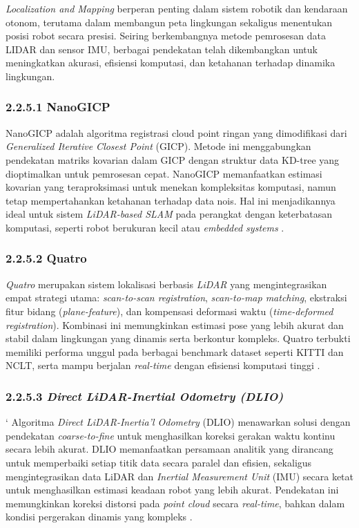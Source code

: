  \textit{ Localization and Mapping} berperan penting dalam sistem robotik dan kendaraan otonom, terutama dalam membangun peta lingkungan sekaligus menentukan posisi robot secara presisi. Seiring berkembangnya metode pemrosesan data LIDAR dan sensor IMU, berbagai pendekatan telah dikembangkan untuk meningkatkan akurasi, efisiensi komputasi, dan ketahanan terhadap dinamika lingkungan. 

\subsubsection{2.2.5.1 NanoGICP}

NanoGICP adalah algoritma registrasi cloud point ringan yang dimodifikasi dari \emph{Generalized Iterative Closest Point} (GICP). Metode ini menggabungkan pendekatan matriks kovarian dalam GICP dengan struktur data KD-tree yang dioptimalkan untuk pemrosesan cepat. NanoGICP memanfaatkan estimasi kovarian yang teraproksimasi untuk menekan kompleksitas komputasi, namun tetap mempertahankan ketahanan terhadap data nois. Hal ini menjadikannya ideal untuk sistem \emph{LiDAR-based SLAM} pada perangkat dengan keterbatasan komputasi, seperti robot berukuran kecil atau \emph{embedded systems} \cite{koide2021nanogicp}.


\subsubsection{2.2.5.2 Quatro}

\emph{Quatro} merupakan sistem lokalisasi berbasis \emph{LiDAR} yang mengintegrasikan empat strategi utama: \emph{scan-to-scan registration}, \emph{scan-to-map matching}, ekstraksi fitur bidang (\emph{plane-feature}), dan kompensasi deformasi waktu (\emph{time-deformed registration}). Kombinasi ini memungkinkan estimasi pose yang lebih akurat dan stabil dalam lingkungan yang dinamis serta berkontur kompleks. Quatro terbukti memiliki performa unggul pada berbagai benchmark dataset seperti KITTI dan NCLT, serta mampu berjalan \emph{real-time} dengan efisiensi komputasi tinggi \cite{kim2022quatro}.

\subsubsection{2.2.5.3 \emph{Direct LiDAR-Inertial Odometry (DLIO)}}`
Algoritma \emph{Direct LiDAR-Inertia'l Odometry} (DLIO) menawarkan solusi dengan pendekatan \emph{coarse-to-fine} untuk menghasilkan koreksi gerakan waktu kontinu secara lebih akurat. DLIO memanfaatkan persamaan analitik yang dirancang untuk memperbaiki setiap titik data secara paralel dan efisien, sekaligus mengintegrasikan data LiDAR dan \emph{Inertial Measurement Unit} (IMU) secara ketat untuk menghasilkan estimasi keadaan robot yang lebih akurat. Pendekatan ini memungkinkan koreksi distorsi pada \emph{point cloud} secara \emph{real-time}, bahkan dalam kondisi pergerakan dinamis yang kompleks \cite{chen2022dlio}.


